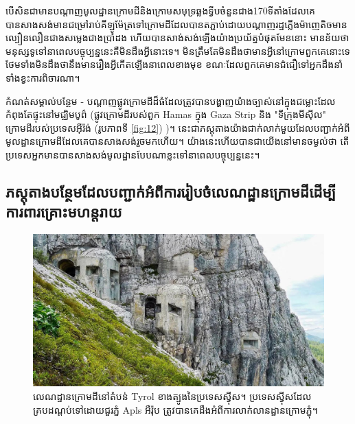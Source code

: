 \documentclass[10pt,twocolumn,letterpaper]{article}
\begin{document}
	បើសិនជាមានបណ្តាញមូលដ្ឋានក្រោមដីនិងក្រោមសមុទ្រឆ្លងទ្វីបចំនួនជាង170ទីតាំងដែលគេបានសាងសង់មានជម្រៅរាប់គីឡូម៉ែត្រទៅក្រោមដី​ ដែលបានតភ្ជាប់ដោយបណ្តាញរដ្ឋភ្លើងម៉ាញេតិចមានល្បឿនលឿនជាងសម្លេងជាងប្រាំដង ហើយបានសាង់សង់ឡើងយ៉ាងប្រយ័ត្នបំផុតមែននោះ មានន័យថាមនុស្សទូទៅនាពេលបច្ចុប្បន្ននេះគឺមិនដឹងអ្វីនោះទេ។ មិនត្រឹមតែមិនដឹងថាមានអ្វីនៅក្រោមពួកគេនោះទេ ថែមទាំងមិនដឹងថានឹងមានរឿងអ្វីកើតឡើងនាពេលខាងមុខ ខណៈដែលពួកគេមានជំជឿទៅអ្នកដឹងនាំទាំងខ្វះការពិចារណា។

	កំណត់សម្គាល់បន្ថែម - បណ្តាញផ្លូវក្រោមដីដ៏ធំដែលត្រូវបានបង្ហាញយ៉ាងច្បាស់នៅក្នុងជម្លោះដែលកំពុងតែផ្ទុះនៅមជ្ឈិមបូព៌ (ផ្លូវក្រោមដីរបស់ពួក Hamas ក្នុង Gaza Strip\cite{38} និង "ទីក្រុងមីស៊ីល" ក្រោមដីរបស់ប្រទេសអុីរ៉ង់ (រូបភាពទី \ref{fig:12}) \cite{39,40})។ នេះជាភស្តុតាងយ៉ាងជាក់លាក់មួយដែលបញ្ជាក់អំពីមូលដ្ឋានក្រោមដីដែលគេបានសាងសង់រួចមកហើយ។ យ៉ាងនេះហើយបានជាយើងនៅមានចម្ងល់ថា តើប្រទេសអ្នកមានបានសាងសង់មូលដ្ឋានបែបណាខ្លះទៅនាពេលបច្ចុប្បន្ននេះ។ 
\subsection{ភស្តុតាងបន្ថែមដែលបញ្ជាក់អំពីការរៀបចំលេណដ្ឋានក្រោមដីដើម្បីការពារគ្រោះមហន្តរាយ}

\begin{figure}[t]
\begin{center}
   \includegraphics[width=1\linewidth]{tyrol.jpg}
\end{center}
   \caption{លេណដ្ឋានក្រោមដីនៅតំបន់ Tyrol ខាងត្បូងនៃប្រទេសស្វុីស។ ប្រទេសស្វុីសដែលគ្របដណ្តប់ទៅដោយជួរភ្នំ Apls អឺរ៉ុប ត្រូវបានគេដឹងអំពីការលាក់លានដ្ឋានក្រោមភ្នុំ\cite{32}។}
\label{fig:7}
\label{fig:onecol}
\end{figure}
\end{document}
